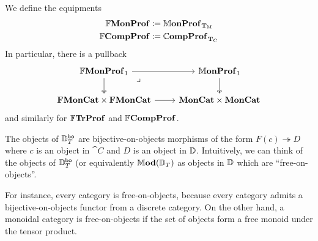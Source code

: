 \documentclass[12pt,oneside,article,draft]{memoir}
\begin{document}
\begin{definition}\label{def:FrMonProf_FrCompProf}
   We define the equipments
   \begin{align*}
      \mathbb{F}\mathbf{MonProf}&\coloneqq\mathbb{M}\mathbf{onProf}_{\mathbf{T}_{\textrm{M}}} \\
      \mathbb{F}\mathbf{CompProf}&\coloneqq\mathbb{C}\mathbf{ompProf}_{\mathbf{T}_{\textrm{C}}}
   \end{align*}
   In particular, there is a pullback
   \begin{equation*}
      \begin{tikzcd}
         \dFrMonProf_1 \ar[r] \ar[d,two heads] \ar[dr,phantom,"\lrcorner" very near start]
            & \dMonProf_1 \ar[d,two heads] \\
         \FrMonCat\times\FrMonCat \ar[r]
            & \MonCat\times\MonCat
      \end{tikzcd}
   \end{equation*}
   and similarly for $\mathbb{F}\mathbf{TrProf}$ and $\mathbb{F}\mathbf{CompProf}$.
\end{definition}

\begin{remark}
   The objects of $\mathbb{D}_T^{\mathsf{bo}}$ are bijective-on-objects morphisms of the form
   $F(c)\twoheadrightarrow D$ where $c$ is an object in $\cat{C}$ and $D$ is an object in
   $\mathbb{D}$. Intuitively, we can think of the objects of $\mathbb{D}_T^{\mathsf{bo}}$ (or equivalently
   $\mathbb{M}\mathbf{od}(\mathbb{D}_T)$ as objects in $\mathbb{D}$ which are ``free-on-objects''.
   
   For instance, every category is free-on-objects, because every category admits a
   bijective-on-objects functor from a discrete category. On the other hand, a monoidal category is
   free-on-objects if the set of objects form a free monoid under the tensor product.
\end{remark}
\end{document}

